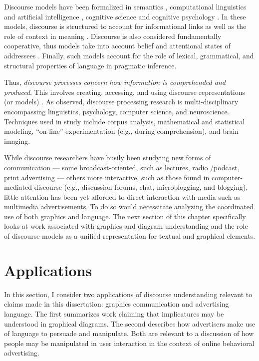 Discourse models have been formalized in semantics  \citep{Kamp:1993wm},  computational linguistics and artificial intelligence  \citep{Hobbs:1985ue,Grosz:1989wu},  cognitive science  \citep{Stenning:2002vd,JohnsonLaird:1989uj,vanDijk:1983tk}  and cognitive psychology  \citep{Clark:1996tm}.  In these models, discourse is structured to account for informational links as well as the role of context in meaning  \citep{Grosz:1986up}.  Discourse is also considered fundamentally cooperative, thus models take into account belief and attentional states of addressees  \citep{Clark:1996tm}.  Finally, such models account for the role of lexical, grammatical, and structural properties of language in pragmatic inference.

Thus, \emph{discourse processes concern how information is comprehended and produced}. This involves creating, accessing, and using discourse representations (or models)  \citep{Graesser:2012wz}. As \cite*{Graesser:2012wz}  observed, discourse processing research is multi-disciplinary encompassing linguistics, psychology, computer science, and neuroscience. Techniques used in study include corpus analysis, mathematical and statistical modeling, ``on-line'' experimentation (e.g., during comprehension), and brain imaging. 

While discourse researchers have busily been studying new forms of communication --- some broadcast-oriented, such as lectures, radio \slash  podcast, print advertising --- others more interactive, such as those found in computer-mediated discourse (e.g., discussion forums, chat, microblogging, and blogging), little attention has been yet afforded to direct interaction with media such as multimedia advertisements. To do so would necessitate analyzing the coordinated use of both graphics and language. The next section of this chapter specifically looks at work associated with graphics and diagram understanding and the role of discourse models as a unified representation for textual and graphical elements.

\section{Applications}
\label{applications}

In this section, I consider two applications of discourse understanding relevant to claims made in this dissertation: graphics communication and advertising language. The first summarizes work claiming that implicatures may be understood in graphical diagrams. The second describes how advertisers make use of language to persuade and manipulate. Both are relevant to a discussion of how people may be manipulated in user interaction in the context of online behavioral advertising.

